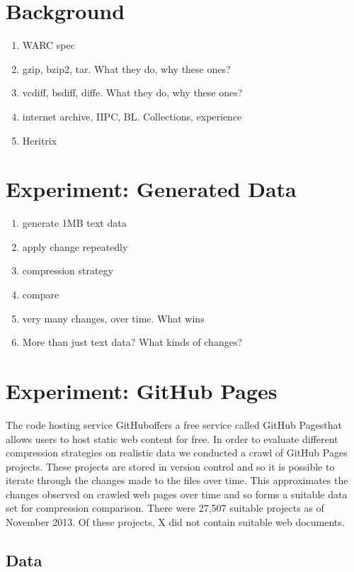 \documentclass[11pt]{article}
\begin{document}
\section{Background}

\begin{enumerate}
\item WARC spec
\item gzip, bzip2, tar. What they do, why these ones?
\item vcdiff, bsdiff, diffe. What they do, why these ones?
\item internet archive, IIPC, BL. Collections, experience
\item Heritrix
\end{enumerate}

\section{Experiment: Generated Data}

\begin{enumerate}
\item generate 1MB text data
\item apply change repeatedly
\item compression strategy
\item compare
\item very many changes, over time. What wins
\item More than just text data? What kinds of changes?
\end{enumerate}

\section{Experiment: GitHub Pages}\label{section:exp:github}

The code hosting service GitHub\footnotemark offers a free service called GitHub Pages\footnotemark that allows users to host static web content for free. In order to evaluate different compression strategies on realistic data we conducted a crawl of GitHub Pages projects. These projects are stored in version control and so it is possible to iterate through the changes made to the files over time. This approximates the changes observed on crawled web pages over time and so forms a suitable data set for compression comparison. There were 27,507 suitable projects as of November 2013. Of these projects, X did not contain suitable web documents.

\subsection{Data}
\end{document}
